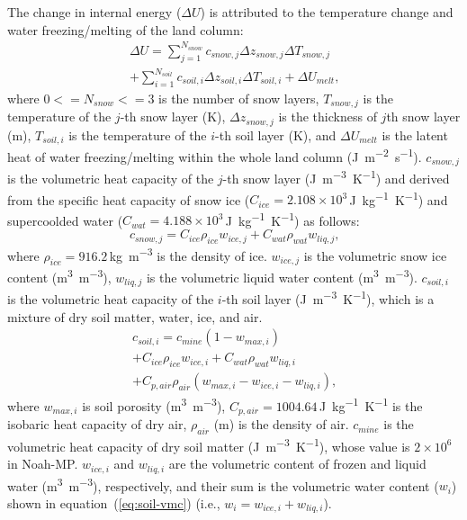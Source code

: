 \documentclass[essd]{copernicus}
\begin{document}
The change in internal energy ($\Delta U$) is attributed to the temperature
change and water freezing/melting of the land column:
\begin{multline}
    \Delta U = \sum_{j=1}^{N_{snow}} c_{snow,j} \Delta z_{snow,j} \Delta T_{snow,j} \\
    + \sum_{i=1}^{N_{soil}} c_{soil,i} \Delta z_{soil,i} \Delta T_{soil,i}
    + \Delta U_{melt} \text{,}
\end{multline}
where $0<=N_{snow}<=3$ is the number of snow layers, $T_{snow,j}$ is the
temperature of the $j$-th snow layer (\unit{K}), $\Delta z_{snow,j}$ is the
thickness of $j$th snow layer (\unit{m}), $T_{soil,i}$ is the temperature of the
$i$-th soil layer (\unit{K}), and $\Delta U_{melt}$ is the latent heat of water
freezing/melting within the whole land column (\unit{J~m^{-2}~s^{-1}}).
$c_{snow,j}$ is the volumetric heat capacity of the $j$-th snow layer
(\unit{J~m^{-3}~K^{-1}}) and derived from the specific heat capacity of snow ice
($C_{ice} = 2.108 \times 10^3$\,\unit{J~kg^{-1}~K^{-1}}) and supercoolded water
($C_{wat} = 4.188 \times 10^3$\,\unit{J~kg^{-1}~K^{-1}}) as follows:
\begin{equation}
    c_{snow,j} = C_{ice} \rho_{ice} w_{ice,j} + C_{wat} \rho_{wat} w_{liq,j} \text{,}
\end{equation}
where $\rho_{ice} = 916.2$\,\unit{kg~m^{-3}} is the density of ice. $w_{ice,j}$
is the volumetric snow ice content (\unit{m^3~m^{-3}}), $w_{liq,j}$ is the
volumetric liquid water content (\unit{m^3~m^{-3}}). $c_{soil,i}$ is the
volumetric heat capacity of the $i$-th soil layer (\unit{J~m^{-3}~K^{-1}}),
which is a mixture of dry soil matter, water, ice, and air.
\begin{multline}
    c_{soil,i} = c_{mine} (1 - w_{max,i}) \\
    + C_{ice} \rho_{ice} w_{ice,i} + C_{wat} \rho_{wat} w_{liq,i} \\
    + C_{p,air} \rho_{air} (w_{max,i} - w_{ice,i} - w_{liq,i}) \text{,}
\end{multline}
where $w_{max,i}$ is soil porosity (\unit{m^3~m^{-3}}), $C_{p,air} =
1004.64$\,\unit{J~kg^{-1}~K^{-1}} is the isobaric heat capacity of dry air,
$\rho_{air}$ (\unit{m}) is the density of air. $c_{mine}$ is the volumetric heat
capacity of dry soil matter (\unit{J~m^{-3}~K^{-1}}), whose value is
$2\times10^6$ in Noah-MP. $w_{ice,i}$ and $w_{liq,i}$ are the volumetric content
of frozen and liquid water (\unit{m^3~m^{-3}}), respectively, and their sum is
the volumetric water content ($w_{i}$) shown in equation~(\ref{eq:soil-vmc})
(i.e., $w_{i} = w_{ice,i} + w_{liq,i}$).
\end{document}

